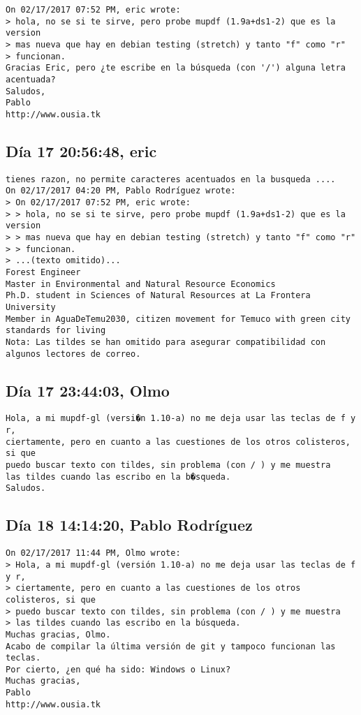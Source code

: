 \documentclass[a4paper,10pt]{article}
\begin{document}
\begin{lstlisting}
On 02/17/2017 07:52 PM, eric wrote:
> hola, no se si te sirve, pero probe mupdf (1.9a+ds1-2) que es la version 
> mas nueva que hay en debian testing (stretch) y tanto "f" como "r" 
> funcionan.
Gracias Eric, pero ¿te escribe en la búsqueda (con '/') alguna letra
acentuada?
Saludos,
Pablo
http://www.ousia.tk

\end{lstlisting}

\subsection{Día 17 20:56:48, eric}

\begin{lstlisting}
tienes razon, no permite caracteres acentuados en la busqueda ....
On 02/17/2017 04:20 PM, Pablo Rodríguez wrote:
> On 02/17/2017 07:52 PM, eric wrote:
> > hola, no se si te sirve, pero probe mupdf (1.9a+ds1-2) que es la version
> > mas nueva que hay en debian testing (stretch) y tanto "f" como "r"
> > funcionan.
> ...(texto omitido)...
Forest Engineer
Master in Environmental and Natural Resource Economics
Ph.D. student in Sciences of Natural Resources at La Frontera University
Member in AguaDeTemu2030, citizen movement for Temuco with green city standards for living
Nota: Las tildes se han omitido para asegurar compatibilidad con algunos lectores de correo.

\end{lstlisting}

\subsection{Día 17 23:44:03, Olmo}

\begin{lstlisting}
Hola, a mi mupdf-gl (versi�n 1.10-a) no me deja usar las teclas de f y r,
ciertamente, pero en cuanto a las cuestiones de los otros colisteros, si que
puedo buscar texto con tildes, sin problema (con / ) y me muestra
las tildes cuando las escribo en la b�squeda.
Saludos.

\end{lstlisting}

\subsection{Día 18 14:14:20, Pablo Rodríguez}

\begin{lstlisting}
On 02/17/2017 11:44 PM, Olmo wrote:
> Hola, a mi mupdf-gl (versión 1.10-a) no me deja usar las teclas de f y r,
> ciertamente, pero en cuanto a las cuestiones de los otros colisteros, si que
> puedo buscar texto con tildes, sin problema (con / ) y me muestra
> las tildes cuando las escribo en la búsqueda.
Muchas gracias, Olmo.
Acabo de compilar la última versión de git y tampoco funcionan las teclas.
Por cierto, ¿en qué ha sido: Windows o Linux?
Muchas gracias,
Pablo
http://www.ousia.tk

\end{lstlisting}
\end{document}
